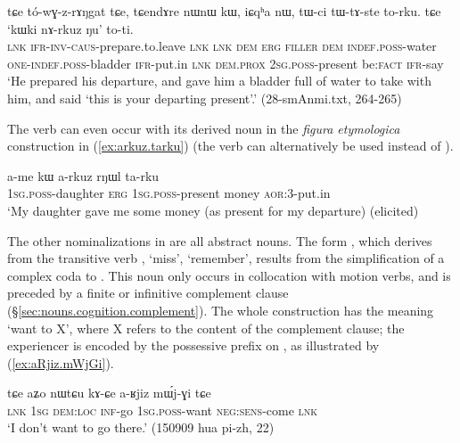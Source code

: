 \begin{exe}
\ex \label{ex:kWki.nArkuz.Nu}
\gll tɕe tó-wɣ-z-rɤŋgat tɕe, tɕendɤre nɯnɯ kɯ, iɕqʰa nɯ,  tɯ-ci tɯ-tɤ-ste to-rku. tɕe `kɯki nɤ-rkuz ŋu' to-ti. \\
\textsc{lnk} \textsc{ifr}-\textsc{inv}-\textsc{caus}-prepare.to.leave \textsc{lnk} \textsc{lnk} \textsc{dem} \textsc{erg} \textsc{filler} \textsc{dem} \textsc{indef}.\textsc{poss}-water \textsc{one}-\textsc{indef}.\textsc{poss}-bladder \textsc{ifr}-put.in \textsc{lnk} \textsc{dem}.\textsc{prox} \textsc{2sg}.\textsc{poss}-present be:\textsc{fact} \textsc{ifr}-say \\
\glt `He prepared his departure, and gave him a bladder full of water to take with him, and said `this is your departing present'.' (28-smAnmi.txt, 264-265)
\end{exe}


The verb  can even occur with its derived noun  in the \textit{figura etymologica} construction in (\ref{ex:arkuz.tarku}) (the verb  can alternatively be used instead of ).

\begin{exe}
\ex \label{ex:arkuz.tarku}
\gll a-me kɯ a-rkuz rŋɯl ta-rku \\
\textsc{1sg}.\textsc{poss}-daughter \textsc{erg} \textsc{1sg}.\textsc{poss}-present money \textsc{aor}:3\flobv{}-put.in \\
\glt `My daughter gave me some money (as present for my departure) (elicited)
\end{exe}

The other nominalizations in  are all abstract nouns. The form , which derives from the transitive verb , `miss', `remember', results from the simplification of a complex coda  to . This noun only occurs in collocation with motion verbs, and is preceded by a finite or infinitive complement clause (§\ref{sec:nouns.cognition.complement}). The whole construction has the meaning `want to X', where X refers to the content of the complement clause; the experiencer is encoded by the possessive prefix on , as illustrated by (\ref{ex:aRjiz.mWjGi}).

\begin{exe}
\ex \label{ex:aRjiz.mWjGi}
\gll  tɕe aʑo nɯtɕu kɤ-ɕe a-ʁjiz mɯ́j-ɣi tɕe \\
\textsc{lnk} \textsc{1sg} \textsc{dem}:\textsc{loc} \textsc{inf}-go \textsc{1sg}.\textsc{poss}-want \textsc{neg}:\textsc{sens}-come \textsc{lnk} \\
\glt `I don't want to go there.' (150909 hua pi-zh, 22)
\end{exe}

